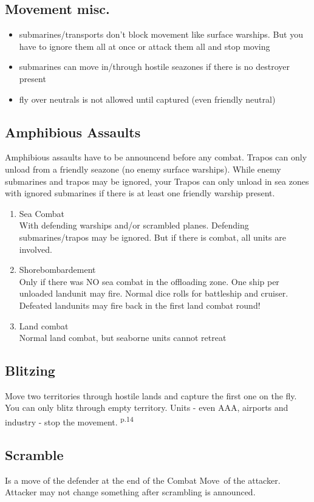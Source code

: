 \documentclass[10pt,a4paper,landscape]{article}
\begin{document}
\begin{multicols*}{3}
\subsection*{Movement misc.}
\begin{itemize}
\item submarines/transports don't block movement like surface warships. But you have to ignore them all at once or attack them all and stop moving
\item submarines can move in/through hostile seazones if there is no destroyer present
\item fly over neutrals is not allowed until captured (even friendly neutral)
\end{itemize}

\subsection*{Amphibious Assaults}
Amphibious assaults have to be announcend before any combat. Trapos can only unload from a friendly seazone (no enemy surface warships). While enemy submarines and trapos may be ignored, your Trapos can only unload in sea zones with ignored submarines if there is at least one friendly warship present.
\begin{enumerate}
\item Sea Combat\\
With defending warships and/or scrambled planes. Defending submarines/trapos may be ignored. But if there is combat, all units are involved.
\item Shorebombardement\\
Only if there was NO sea combat in the offloading zone.  One ship per unloaded landunit may fire. Normal dice rolls for battleship and cruiser. Defeated landunits may fire back in the first land combat round!
\item Land combat\\
Normal land combat, but seaborne units cannot retreat
\end{enumerate}

\subsection*{Blitzing}
Move two territories through hostile lands and capture the first one on the fly. You can only blitz through empty territory. Units - even AAA, airports and industry - stop the movement. \textsuperscript{p.14}

\subsection*{Scramble}
Is a move of the defender at the end of the \glqq Combat Move\grqq\ of the attacker. Attacker may not change something after scrambling is announced.


\end{multicols*}
\end{document}
